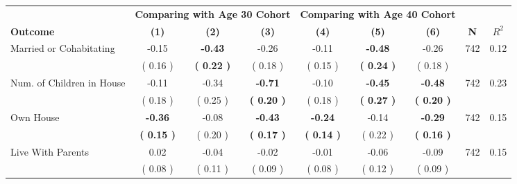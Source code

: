 \begin{tabular}{lcccccccc}
\toprule
 & \multicolumn{3}{c}{\textbf{Comparing with Age 30 Cohort}} & \multicolumn{3}{c}{\textbf{Comparing with Age 40 Cohort}} & \\
\cmidrule(lr){2-4} \cmidrule(lr){5-7} 
 \textbf{Outcome} & \textbf{(1)} & \textbf{(2)} & \textbf{(3)} & \textbf{(4)} & \textbf{(5)} & \textbf{(6)} & \textbf{N} & \textbf{$ R^2$} \\
\midrule
Married or Cohabitating &     -0.15 & \textbf{    -0.43} &     -0.26 &     -0.11 & \textbf{    -0.48} &     -0.26 & 742 &       0.12 \\ 
 & (     0.16 ) & \textbf{(     0.22 )} & (     0.18 ) & (     0.15 ) & \textbf{(     0.24 )} & (     0.18 ) & \\
Num. of Children in House &     -0.11 &     -0.34 & \textbf{    -0.71} &     -0.10 & \textbf{    -0.45} & \textbf{    -0.48} & 742 &       0.23 \\ 
 & (     0.18 ) & (     0.25 ) & \textbf{(     0.20 )} & (     0.18 ) & \textbf{(     0.27 )} & \textbf{(     0.20 )} & \\
Own House & \textbf{    -0.36} &     -0.08 & \textbf{    -0.43} & \textbf{    -0.24} &     -0.14 & \textbf{    -0.29} & 742 &       0.15 \\ 
 & \textbf{(     0.15 )} & (     0.20 ) & \textbf{(     0.17 )} & \textbf{(     0.14 )} & (     0.22 ) & \textbf{(     0.16 )} & \\
Live With Parents &      0.02 &     -0.04 &     -0.02 &     -0.01 &     -0.06 &     -0.09 & 742 &       0.15 \\ 
 & (     0.08 ) & (     0.11 ) & (     0.09 ) & (     0.08 ) & (     0.12 ) & (     0.09 ) & \\
\bottomrule
\end{tabular}
